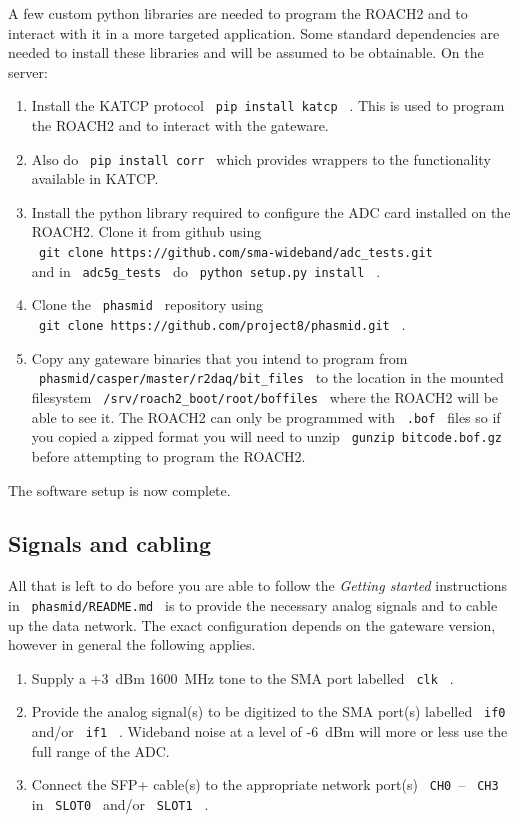 \documentclass[a4paper,10pt]{article}
\newcommand{\ilcode}[1]{\begingroup
	\setlength{\fboxsep}{1pt}\colorbox{ilcodebg}{\small\tt%
		#1%
	}\endgroup}
\begin{document}
A few custom python libraries are needed to program the ROACH2 and to 
interact with it in a more targeted application. Some standard 
dependencies are needed to install these libraries and will be assumed 
to be obtainable. On the server:
\begin{enumerate}
	\item Install the KATCP protocol \ilcode{pip install katcp} . This
	is used to program the ROACH2 and to interact with the gateware. 
	\item Also do \ilcode{pip install corr} which provides wrappers to
	the functionality available in KATCP.
	\item Install the python library required to configure the ADC card 
	installed on the ROACH2. Clone it from github using\\
	\ilcode{git clone https://github.com/sma-wideband/adc\_tests.git}\\
	and in \ilcode{adc5g\_tests} do \ilcode{python setup.py install} .
	\item Clone the \ilcode{phasmid} repository using\\
	\ilcode{git clone https://github.com/project8/phasmid.git} . 
	\item Copy any gateware binaries that you intend to program from\\
	\ilcode{phasmid/casper/master/r2daq/bit\_files} to the location in the 
	mounted filesystem \ilcode{/srv/roach2\_boot/root/boffiles} 
	where the ROACH2 will be able to see it. The ROACH2 can only be 
	programmed with \ilcode{.bof} files so if you copied a zipped format 
	you will need to unzip \ilcode{gunzip bitcode.bof.gz} before 
	attempting to program the ROACH2.
\end{enumerate}

\noindent The software setup is now complete.
\subsection{Signals and cabling}
\label{sec:snc}
All that is left to do before you are able to follow the {\em Getting 
started} instructions in \ilcode{phasmid/README.md} is to provide the 
necessary analog signals and to cable up the data network. The exact 
configuration depends on the gateware version, however in general the 
following applies.
\begin{enumerate}
	\item Supply a +3~dBm 1600~MHz tone to the SMA port labelled
	\ilcode{clk} .
	\item Provide the analog signal(s) to be digitized to the SMA port(s) 
	labelled \ilcode{if0} and/or \ilcode{if1} .
	Wideband noise at a level of -6~dBm will more or less use the full 
	range of the ADC.
	\item Connect the SFP+ cable(s) to the appropriate network port(s)
	\ilcode{CH0}--\ilcode{CH3} in \ilcode{SLOT0} and/or \ilcode{SLOT1} .
\end{enumerate}
\end{document}

